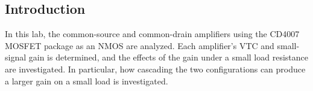 \subsection{Introduction}
In this lab, the common-source and common-drain amplifiers using the CD4007 MOSFET package as an NMOS are analyzed.
Each amplifier's VTC and small-signal gain is determined, and the effects of the gain under a small load resistance are investigated.
In particular, how cascading the two configurations can produce a larger gain on a small load is investigated.

